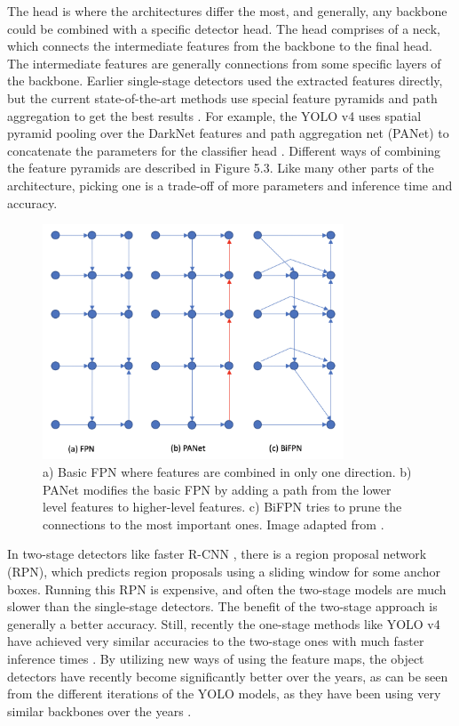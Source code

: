 The head is where the architectures differ the most, and generally, any backbone could be combined with a specific detector head.
The head comprises of a neck, which connects the intermediate features from the backbone to the final head.
The intermediate features are generally connections from some specific layers of the backbone.
Earlier single-stage detectors used the extracted features directly, but the current state-of-the-art methods use special feature pyramids and path aggregation to get the best results \citep{efficientDet}.
For example, the YOLO v4 uses spatial pyramid pooling \citep{SPP} over the DarkNet features and path aggregation net (PANet) \citep{PANET} to concatenate the parameters for the classifier head \citep{yolov4}.
Different ways of combining the feature pyramids are described in Figure 5.3.
Like many other parts of the architecture, picking one is a trade-off of more parameters and inference time and accuracy.
\begin{figure}[h!]
    \centering
    \includegraphics[width=0.8\textwidth]{imgs/detector_necks.png}
    \caption{a) Basic FPN \citep{FPN} where features are combined in only one direction. b) PANet modifies the basic FPN by adding a path from the lower level features to higher-level features. c) BiFPN tries to prune the connections to the most important ones. Image adapted from \citep{efficientDet}.}
\end{figure}

In two-stage detectors like faster R-CNN \citep{faster-rcnn}, there is a region proposal network (RPN), which predicts region proposals using a sliding window for some anchor boxes.
Running this RPN is expensive, and often the two-stage models are much slower than the single-stage detectors.
The benefit of the two-stage approach is generally a better accuracy. 
Still, recently the one-stage methods like YOLO v4 have achieved very similar accuracies to the two-stage ones with much faster inference times \citep{yolov4}.
By utilizing new ways of using the feature maps, the object detectors have recently become significantly better over the years, as can be seen from the different iterations of the YOLO models, as they have been using very similar backbones over the years \citep{yolov4}.

